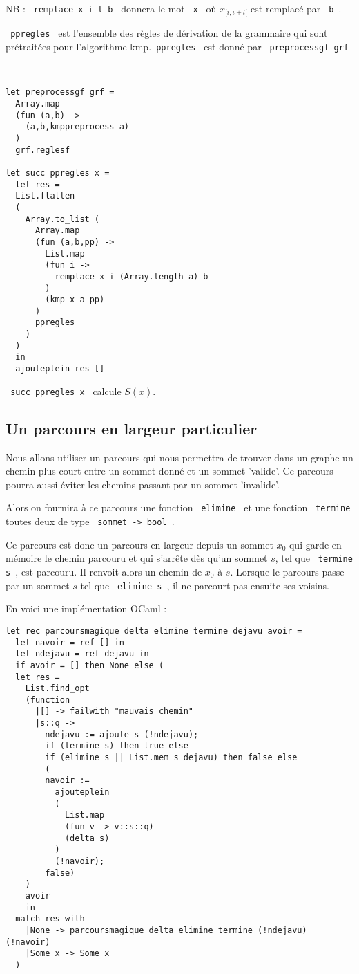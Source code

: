 \documentclass[a4paper,12pt]{article}
\begin{document}
{\color{gray} NB :  \texttt{ remplace x i l b } donnera le mot \texttt{ x } où $x_{[i,i+l[}$ est remplacé par \texttt{ b }.

\texttt{ ppregles } est l'ensemble des règles de dérivation de la grammaire qui 
sont prétraitées pour l'algorithme kmp.\texttt{ ppregles } est donné par \texttt{ preprocessgf grf }}\\
{\color{DarkBlue}\begin{verbatim}
let preprocessgf grf =
  Array.map 
  (fun (a,b) ->
    (a,b,kmppreprocess a) 
  )
  grf.reglesf 

let succ ppregles x = 
  let res =
  List.flatten
  (
    Array.to_list (
      Array.map
      (fun (a,b,pp) ->
        List.map 
        (fun i ->
          remplace x i (Array.length a) b
        )
        (kmp x a pp)
      )
      ppregles
    )
  )
  in
  ajouteplein res []
\end{verbatim}}

\texttt{ succ ppregles x } calcule $S(x)$.

\subsection{Un parcours en largeur particulier}
Nous allons utiliser un parcours qui nous permettra de trouver dans un graphe un chemin plus court entre un sommet donné et un sommet 'valide'.
Ce parcours pourra aussi éviter les chemins passant par un sommet 'invalide'.

Alors on fournira à ce parcours une fonction \texttt{ elimine } et une fonction \texttt{ termine } toutes deux de type \texttt{ sommet -> bool }.

Ce parcours est donc un parcours en largeur depuis un sommet $x_0$ qui garde en mémoire le chemin parcouru et qui s'arrête dès qu'un 
sommet $s$, tel que \texttt{ termine s }, est parcouru. Il renvoit alors un chemin de $x_0$ à $s$. Lorsque le parcours passe par un sommet $s$ tel que \texttt{ elimine s }, 
il ne parcourt pas ensuite ses voisins.

En voici une implémentation OCaml :

{\color{DarkBlue}\begin{verbatim}
let rec parcoursmagique delta elimine termine dejavu avoir =
  let navoir = ref [] in
  let ndejavu = ref dejavu in
  if avoir = [] then None else (
  let res = 
    List.find_opt
    (function
      |[] -> failwith "mauvais chemin"
      |s::q ->
        ndejavu := ajoute s (!ndejavu);
        if (termine s) then true else
        if (elimine s || List.mem s dejavu) then false else
        (
        navoir := 
          ajouteplein
          (
            List.map
            (fun v -> v::s::q)
            (delta s)
          )
          (!navoir);
        false)
    )
    avoir
    in
  match res with
    |None -> parcoursmagique delta elimine termine (!ndejavu) (!navoir)
    |Some x -> Some x
  )
\end{verbatim}}
\end{document}
